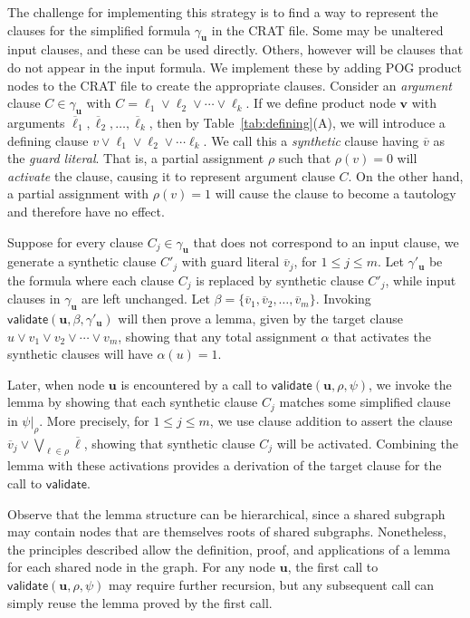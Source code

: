 \documentclass[letterpaper,USenglish,cleveref, autoref, thm-restate]{lipics-v2021}
\newcommand{\obar}[1]{\overline{#1}}
\newcommand{\lit}{\ell}
\newcommand{\assign}{\alpha}
\newcommand{\passign}{\rho}
\newcommand{\lassign}{\beta}
\newcommand{\validate}{\textsf{validate}}
\newcommand{\makenode}[1]{\mathbf{#1}}
\newcommand{\nodeu}{\makenode{u}}
\newcommand{\nodev}{\makenode{v}}
\newcommand{\simplify}[2]{#1|_{#2}}
\begin{document}
The challenge for implementing this strategy is to find a way to
represent the clauses for the simplified formula $\gamma_{\nodeu}$ in the CRAT file.  Some may be
unaltered input clauses, and these can be used directly.  Others,
however will be clauses that do not appear in the input formula.  We
implement these by adding POG product nodes to the CRAT file to create
the appropriate clauses.  Consider an {\em argument} clause
$C \in \gamma_{\nodeu}$ with $C = \lit_1 \lor \lit_2 \lor \cdots \lor \lit_k$.  If we
define product node $\nodev$ with arguments
$\obar{\lit}_1, \obar{\lit}_2, \ldots, \obar{\lit}_k$, then by
Table~\ref{tab:defining}(A), we will introduce a defining clause
$v \lor \lit_1 \lor \lit_2 \lor \cdots \lit_k$.  We call this a {\em
  synthetic} clause having $\obar{v}$ as the {\em guard literal}.
That is, a partial assignment $\passign$ such that $\passign(v) = 0$ will {\em
  activate} the clause, causing it to represent argument clause $C$.  On the other
hand, a partial assignment with $\passign(v) = 1$ will
cause the clause to become a tautology and therefore have no effect.

Suppose for every clause $C_j \in \gamma_{\nodeu}$ that does not correspond to
an input clause, we generate a synthetic clause $C'_j$ with guard literal
$\obar{v}_j$, for $1 \leq j \leq m$.  Let $\gamma'_{\nodeu}$ be the formula where each clause $C_j$ is replaced by synthetic clause $C'_j$,
while input clauses in $\gamma_{\nodeu}$ are left unchanged.
Let $\lassign = \{ \obar{v}_1, \obar{v}_2, \ldots, \obar{v}_m \}$.
Invoking $\validate(\nodeu, \lassign, \gamma'_{\nodeu})$
 will then prove a lemma, given by the target clause
 $u \lor v_1 \lor v_2 \lor \cdots \lor v_m$,
 showing that any total assignment $\assign$ that activates the synthetic clauses will have $\assign(u) = 1$.

Later, when node $\nodeu$ is encountered by a call to $\validate(\nodeu, \passign, \psi)$, we invoke the lemma
by showing that each synthetic clause
$C_j$ matches some simplified clause in $\simplify{\psi}{\passign}$.  More precisely,
for $1 \leq j \leq m$,
we use clause addition to assert the clause
$\obar{v}_j \lor \bigvee_{\lit \in \passign} \obar{\lit}$,
showing that synthetic clause $C_j$ will be activated.
Combining the lemma with these activations provides a derivation of the target clause for the call to $\validate$.

Observe that the lemma structure can be hierarchical, since a shared
subgraph may contain nodes that are themselves roots of shared
subgraphs.  Nonetheless, the principles described allow the
definition, proof, and applications of a lemma for each shared node in
the graph.  For any node $\nodeu$, the first call to
$\validate(\nodeu, \passign, \psi)$ may require further recursion,
but any subsequent call can simply reuse the lemma proved by the first call.
\end{document}
